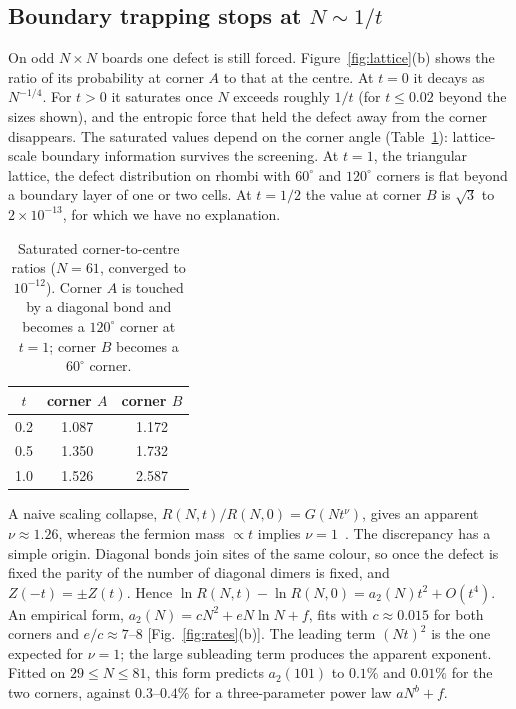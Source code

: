 \documentclass[aps,pre,twocolumn,superscriptaddress,nofootinbib,floatfix]{revtex4-2}
\begin{document}
\subsection{Boundary trapping stops at $N\sim1/t$}
On odd $N\times N$ boards one defect is still forced. Figure~\ref{fig:lattice}(b) shows the ratio of its probability at corner $A$ to that at the centre. At $t=0$ it decays as $N^{-1/4}$. For $t>0$ it saturates once $N$ exceeds roughly $1/t$ (for $t\le0.02$ beyond the sizes shown), and the entropic force that held the defect away from the corner disappears. The saturated values depend on the corner angle (Table~\ref{tab:sat}): lattice-scale boundary information survives the screening. At $t=1$, the triangular lattice, the defect distribution on rhombi with $60^\circ$ and $120^\circ$ corners is flat beyond a boundary layer of one or two cells. At $t=1/2$ the value at corner $B$ is $\sqrt3$ to $2\times10^{-13}$, for which we have no explanation.

\begin{table}[b]
\caption{Saturated corner-to-centre ratios ($N=61$, converged to $10^{-12}$). Corner $A$ is touched by a diagonal bond and becomes a $120^\circ$ corner at $t=1$; corner $B$ becomes a $60^\circ$ corner.}
\label{tab:sat}
\begin{ruledtabular}
\begin{tabular}{ccc}
$t$ & corner $A$ & corner $B$\\ \hline
0.2 & 1.087 & 1.172\\
0.5 & 1.350 & 1.732\\
1.0 & 1.526 & 2.587\\
\end{tabular}
\end{ruledtabular}
\end{table}

A naive scaling collapse, $R(N,t)/R(N,0)=G(Nt^{\nu})$, gives an apparent $\nu\approx1.26$, whereas the fermion mass $\propto t$ implies $\nu=1$~\cite{FendleyMoessnerSondhi2002}. The discrepancy has a simple origin. Diagonal bonds join sites of the same colour, so once the defect is fixed the parity of the number of diagonal dimers is fixed, and $Z(-t)=\pm Z(t)$. Hence $\ln R(N,t)-\ln R(N,0)=a_2(N)t^2+O(t^4)$. An empirical form, $a_2(N)=cN^2+eN\ln N+f$, fits with $c\approx0.015$ for both corners and $e/c\approx7$--$8$ [Fig.~\ref{fig:rates}(b)]. The leading term $(Nt)^2$ is the one expected for $\nu=1$; the large subleading term produces the apparent exponent. Fitted on $29\le N\le81$, this form predicts $a_2(101)$ to $0.1\%$ and $0.01\%$ for the two corners, against $0.3$--$0.4\%$ for a three-parameter power law $aN^b+f$.
\end{document}
